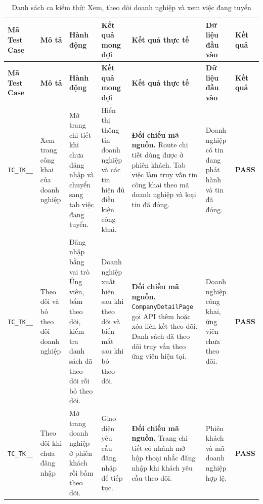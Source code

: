\begin{landscape}
{
\fontsize{9.5}{11.5}\selectfont
\setlength{\tabcolsep}{3pt}
\renewcommand{\arraystretch}{1.2}
\begin{longtable}{|>{\raggedright\arraybackslash}p{2.1cm}|>{\raggedright\arraybackslash}p{2.8cm}|>{\raggedright\arraybackslash}p{3.8cm}|>{\raggedright\arraybackslash}p{4.0cm}|>{\raggedright\arraybackslash}p{5.0cm}|>{\raggedright\arraybackslash}p{3.2cm}|>{\centering\arraybackslash}p{1.3cm}|}
    \caption{Danh sách ca kiểm thử: Xem, theo dõi doanh nghiệp và xem việc đang tuyển} \label{tab:ts-tk-05} \\
    \hline
    \textbf{Mã Test Case} & \textbf{Mô tả} & \textbf{Hành động} & \textbf{Kết quả mong đợi} & \textbf{Kết quả thực tế} & \textbf{Dữ liệu đầu vào} & \textbf{Kết quả} \\
    \hline
    \endfirsthead
    \hline
    \textbf{Mã Test Case} & \textbf{Mô tả} & \textbf{Hành động} & \textbf{Kết quả mong đợi} & \textbf{Kết quả thực tế} & \textbf{Dữ liệu đầu vào} & \textbf{Kết quả} \\
    \hline
    \endhead
    \hline
    \endfoot
    \hline
    \endlastfoot
    \texttt{TC\_\allowbreak TK\_\allowbreak 05\_\allowbreak 01} & Xem trang công khai của doanh nghiệp & Mở trang chi tiết khi chưa đăng nhập và chuyển sang tab việc đang tuyển. & Hiển thị thông tin doanh nghiệp và các tin hiện đủ điều kiện công khai. & \textbf{Đối chiếu mã nguồn.} Route chi tiết dùng được ở phiên khách. Tab việc làm truy vấn tin công khai theo mã doanh nghiệp và loại tin đã đóng. & Doanh nghiệp có tin đang phát hành và tin đã đóng. & \textbf{PASS} \\
    \hline
    \texttt{TC\_\allowbreak TK\_\allowbreak 05\_\allowbreak 02} & Theo dõi và bỏ theo dõi doanh nghiệp & Đăng nhập bằng vai trò Ứng viên, bấm theo dõi, kiểm tra danh sách đã theo dõi rồi bỏ theo dõi. & Doanh nghiệp xuất hiện sau khi theo dõi và biến mất sau khi bỏ theo dõi. & \textbf{Đối chiếu mã nguồn.} \texttt{CompanyDetailPage} gọi API thêm hoặc xóa liên kết theo dõi. Danh sách đã theo dõi truy vấn theo ứng viên hiện tại. & Doanh nghiệp công khai, ứng viên chưa theo dõi. & \textbf{PASS} \\
    \hline
    \texttt{TC\_\allowbreak TK\_\allowbreak 05\_\allowbreak 03} & Theo dõi khi chưa đăng nhập & Mở trang doanh nghiệp ở phiên khách rồi bấm theo dõi. & Giao diện yêu cầu đăng nhập để tiếp tục. & \textbf{Đối chiếu mã nguồn.} Trang chi tiết có nhánh mở hộp thoại nhắc đăng nhập khi khách yêu cầu theo dõi. & Phiên khách và mã doanh nghiệp hợp lệ. & \textbf{PASS} \\
    \hline

\end{longtable}}
\end{landscape}
